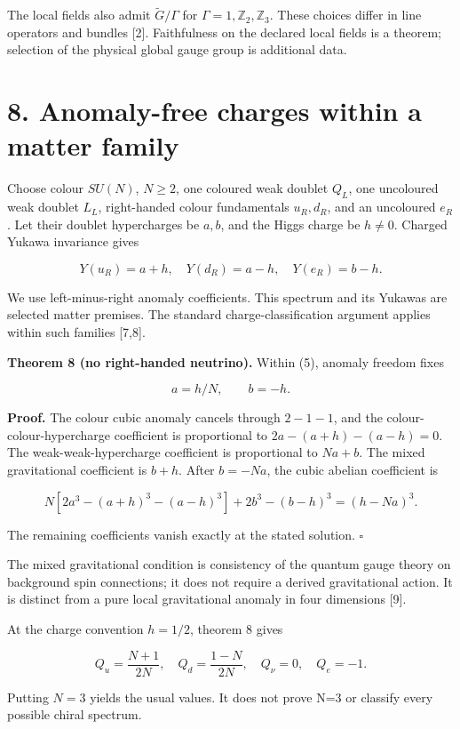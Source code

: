 \documentclass[
  11pt,
  a4paper,
]{article}
\begin{document}
The local fields also admit \(\widetilde G/\Gamma\) for \(\Gamma=1,\mathbb Z_2,\mathbb Z_3\). These choices differ in line operators and bundles {[}2{]}. Faithfulness on the declared local fields is a theorem; selection of the physical global gauge group is additional data.

\section{8. Anomaly-free charges within a matter family}\label{anomaly-free-charges-within-a-matter-family}

Choose colour \(SU(N)\), \(N\ge2\), one coloured weak doublet \(Q_L\), one uncoloured weak doublet \(L_L\), right-handed colour fundamentals \(u_R,d_R\), and an uncoloured \(e_R\). Let their doublet hypercharges be \(a,b\), and the Higgs charge be \(h\ne0\). Charged Yukawa invariance gives

\[
 Y(u_R)=a+h,\quad Y(d_R)=a-h,\quad Y(e_R)=b-h. \tag{5}
\]

We use left-minus-right anomaly coefficients. This spectrum and its Yukawas are selected matter premises. The standard charge-classification argument applies within such families {[}7,8{]}.

\textbf{Theorem 8 (no right-handed neutrino).} Within (5), anomaly freedom fixes

\[
 a=h/N,\qquad b=-h.
\]

\textbf{Proof.} The colour cubic anomaly cancels through \(2-1-1\), and the colour-colour-hypercharge coefficient is proportional to \(2a-(a+h)-(a-h)=0\). The weak-weak-hypercharge coefficient is proportional to \(Na+b\). The mixed gravitational coefficient is \(b+h\). After \(b=-Na\), the cubic abelian coefficient is

\[
 N[2a^3-(a+h)^3-(a-h)^3]+2b^3-(b-h)^3
 =(h-Na)^3. \tag{6}
\]

The remaining coefficients vanish exactly at the stated solution. \(\square\)

The mixed gravitational condition is consistency of the quantum gauge theory on background spin connections; it does not require a derived gravitational action. It is distinct from a pure local gravitational anomaly in four dimensions {[}9{]}.

At the charge convention \(h=1/2\), theorem 8 gives

\[
 Q_u=\frac{N+1}{2N},\quad Q_d=\frac{1-N}{2N},\quad Q_\nu=0,\quad Q_e=-1.
\]

Putting \(N=3\) yields the usual values. It does not prove N=3 or classify every possible chiral spectrum.
\end{document}
